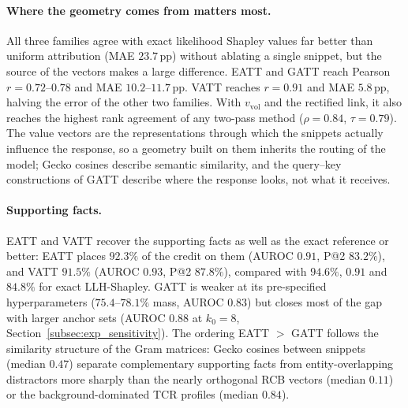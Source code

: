 \paragraph{Where the geometry comes from matters most.}
All three families agree with exact likelihood Shapley values far better than uniform attribution (MAE $23.7$\,pp) without ablating a single snippet, but the source of the vectors makes a large difference. EATT and GATT reach Pearson $r = 0.72$--$0.78$ and MAE $10.2$--$11.7$\,pp. VATT reaches $r = 0.91$ and MAE $5.8$\,pp, halving the error of the other two families. With $v_{\text{vol}}$ and the rectified link, it also reaches the highest rank agreement of any two-pass method ($\rho = 0.84$, $\tau = 0.79$). The value vectors are the representations through which the snippets actually influence the response, so a geometry built on them inherits the routing of the model; Gecko cosines describe semantic similarity, and the query--key constructions of GATT describe where the response looks, not what it receives.

\paragraph{Supporting facts.}
EATT and VATT recover the supporting facts as well as the exact reference or better: EATT places $92.3\%$ of the credit on them (AUROC $0.91$, P@2 $83.2\%$), and VATT $91.5\%$ (AUROC $0.93$, P@2 $87.8\%$), compared with $94.6\%$, $0.91$ and $84.8\%$ for exact LLH-Shapley. GATT is weaker at its pre-specified hyperparameters ($75.4$--$78.1\%$ mass, AUROC $0.83$) but closes most of the gap with larger anchor sets (AUROC $0.88$ at $k_0 = 8$, Section~\ref{subsec:exp_sensitivity}). The ordering EATT $>$ GATT follows the similarity structure of the Gram matrices: Gecko cosines between snippets (median $0.47$) separate complementary supporting facts from entity-overlapping distractors more sharply than the nearly orthogonal RCB vectors (median $0.11$) or the background-dominated TCR profiles (median $0.84$).

